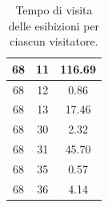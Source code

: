\documentclass[12pt]{article}
\begin{document}
\begin{table}[!ht]
\begin{tabular}{|c|c|c|}
        68                  & 11                  & 116.69                   \\ \hline
        68                  & 12                  & 0.86                     \\ \hline
        68                  & 13                  & 17.46                    \\ \hline
        68                  & 30                  & 2.32                     \\ \hline
        68                  & 31                  & 45.70                    \\ \hline
        68                  & 35                  & 0.57                     \\ \hline
        68                  & 36                  & 4.14                     \\ \hline
    \end{tabular}
    \caption{Tempo di visita delle esibizioni per ciascun visitatore.}
    \label{persons_time_visiting}
\end{table}
\end{document}
